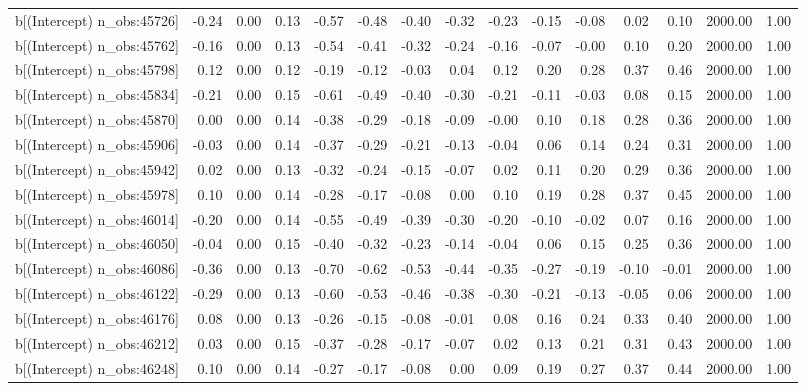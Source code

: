 \begin{table}[ht]
\begin{tabular}{rrrrrrrrrrrrrrr}
  b[(Intercept) n\_obs:45726] & -0.24 & 0.00 & 0.13 & -0.57 & -0.48 & -0.40 & -0.32 & -0.23 & -0.15 & -0.08 & 0.02 & 0.10 & 2000.00 & 1.00 \\ 
  b[(Intercept) n\_obs:45762] & -0.16 & 0.00 & 0.13 & -0.54 & -0.41 & -0.32 & -0.24 & -0.16 & -0.07 & -0.00 & 0.10 & 0.20 & 2000.00 & 1.00 \\ 
  b[(Intercept) n\_obs:45798] & 0.12 & 0.00 & 0.12 & -0.19 & -0.12 & -0.03 & 0.04 & 0.12 & 0.20 & 0.28 & 0.37 & 0.46 & 2000.00 & 1.00 \\ 
  b[(Intercept) n\_obs:45834] & -0.21 & 0.00 & 0.15 & -0.61 & -0.49 & -0.40 & -0.30 & -0.21 & -0.11 & -0.03 & 0.08 & 0.15 & 2000.00 & 1.00 \\ 
  b[(Intercept) n\_obs:45870] & 0.00 & 0.00 & 0.14 & -0.38 & -0.29 & -0.18 & -0.09 & -0.00 & 0.10 & 0.18 & 0.28 & 0.36 & 2000.00 & 1.00 \\ 
  b[(Intercept) n\_obs:45906] & -0.03 & 0.00 & 0.14 & -0.37 & -0.29 & -0.21 & -0.13 & -0.04 & 0.06 & 0.14 & 0.24 & 0.31 & 2000.00 & 1.00 \\ 
  b[(Intercept) n\_obs:45942] & 0.02 & 0.00 & 0.13 & -0.32 & -0.24 & -0.15 & -0.07 & 0.02 & 0.11 & 0.20 & 0.29 & 0.36 & 2000.00 & 1.00 \\ 
  b[(Intercept) n\_obs:45978] & 0.10 & 0.00 & 0.14 & -0.28 & -0.17 & -0.08 & 0.00 & 0.10 & 0.19 & 0.28 & 0.37 & 0.45 & 2000.00 & 1.00 \\ 
  b[(Intercept) n\_obs:46014] & -0.20 & 0.00 & 0.14 & -0.55 & -0.49 & -0.39 & -0.30 & -0.20 & -0.10 & -0.02 & 0.07 & 0.16 & 2000.00 & 1.00 \\ 
  b[(Intercept) n\_obs:46050] & -0.04 & 0.00 & 0.15 & -0.40 & -0.32 & -0.23 & -0.14 & -0.04 & 0.06 & 0.15 & 0.25 & 0.36 & 2000.00 & 1.00 \\ 
  b[(Intercept) n\_obs:46086] & -0.36 & 0.00 & 0.13 & -0.70 & -0.62 & -0.53 & -0.44 & -0.35 & -0.27 & -0.19 & -0.10 & -0.01 & 2000.00 & 1.00 \\ 
  b[(Intercept) n\_obs:46122] & -0.29 & 0.00 & 0.13 & -0.60 & -0.53 & -0.46 & -0.38 & -0.30 & -0.21 & -0.13 & -0.05 & 0.06 & 2000.00 & 1.00 \\ 
  b[(Intercept) n\_obs:46176] & 0.08 & 0.00 & 0.13 & -0.26 & -0.15 & -0.08 & -0.01 & 0.08 & 0.16 & 0.24 & 0.33 & 0.40 & 2000.00 & 1.00 \\ 
  b[(Intercept) n\_obs:46212] & 0.03 & 0.00 & 0.15 & -0.37 & -0.28 & -0.17 & -0.07 & 0.02 & 0.13 & 0.21 & 0.31 & 0.43 & 2000.00 & 1.00 \\ 
  b[(Intercept) n\_obs:46248] & 0.10 & 0.00 & 0.14 & -0.27 & -0.17 & -0.08 & 0.00 & 0.09 & 0.19 & 0.27 & 0.37 & 0.44 & 2000.00 & 1.00 \\ 

\end{tabular}
\end{table}
